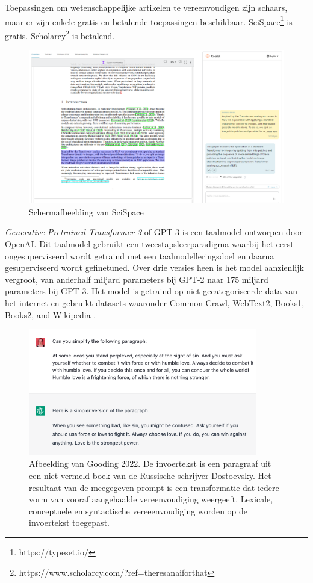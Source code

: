 \medspace

Toepassingen om wetenschappelijke artikelen te vereenvoudigen zijn schaars, maar er zijn enkele gratis en betalende toepassingen beschikbaar. SciSpace\footnote{https://typeset.io/} is gratis. Scholarcy\footnote{https://www.scholarcy.com/?ref=theresanaiforthat} is betalend. 

\begin{figure}
	\includegraphics{img/typeset-example.png}
	\caption{Schermafbeelding van SciSpace}
\end{figure}

\medspace

\textit{Generative Pretrained Transformer 3} of GPT-3 is een taalmodel ontworpen door OpenAI. Dit taalmodel gebruikt een tweestapsleerparadigma waarbij het eerst ongesuperviseerd wordt getraind met een taalmodelleringsdoel en daarna gesuperviseerd wordt gefinetuned. Over drie versies heen is het model aanzienlijk vergroot, van anderhalf miljard parameters bij GPT-2 naar 175 miljard parameters bij GPT-3. Het model is getraind op niet-gecategoriseerde data van het internet en gebruikt datasets waaronder Common Crawl, WebText2, Books1, Books2, and Wikipedia \autocite{Radford2019, Li2022}.

\begin{figure}[H]
	\includegraphics[width=10cm]{img/chatgpt-example-simplification-gooding.png}
	\caption{Afbeelding van Gooding 2022. De invoertekst is een paragraaf uit een niet-vermeld boek van de Russische schrijver Dostoevsky. Het resultaat van de meegegeven prompt is een transformatie dat iedere vorm van vooraf aangehaalde vereenvoudiging weergeeft. Lexicale, conceptuele en syntactische vereeenvoudiging worden op de invoertekst toegepast.}
\end{figure}

